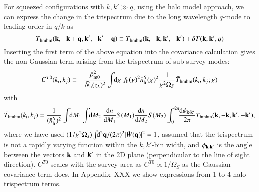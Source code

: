 \documentclass[onecolumn,notitlepage,showpacs,amsmath,amssymb,prd,floatfix]{revtex4-1}
\newcommand{\bk}{{\bf k}}
\newcommand{\bq}{{\bf q}}
\newcommand{\tW}{\tilde{W}}
\newcommand{\dr}{\mathrm{d}}
\newcommand{\bnhs}{\bar{n}_{\rm h}^S}
\newcommand{\bNh}{\bar{N}_{\rm h}}
\begin{document}
For squeezed configurations with $k,k'\gg q$, using the halo model
approach, we can express the change in the trispectrum due to the long
wavelength $q$-mode to leading order in $q/k$ as
%
\begin{equation}
 T_{\rm hmhm}(\bk,-\bk+\bq,\bk',-\bk'-\bq)\equiv T_{\rm
  hmhm}(\bk,-\bk,\bk',-\bk')
  +\delta T(\bk,\bk',q)
  \label{eq:def_dT}
\end{equation}
%
Inserting the first term of the above equation into the covariance
calculation gives the non-Gaussian term arising from the trispectrum of
sub-survey modes:
%
\begin{eqnarray}
 C^{T0}(k_i,k_j)&\equiv &\frac{\bar{\rho}_{\rm m0}^2}{\bNh(z_L)^2}
  \int\!\!\dr\chi~f_{\rm h}(\chi)^2 \bnhs(\chi)^2\frac{1}{\chi^2\Omega_S}
    \bar{T}_{\rm
    hmhm}(k_i,k_j;\chi)
    \label{eq:cov_T0}
\end{eqnarray}
%
with
%
\begin{equation}
\bar{T}_{\rm hmhm}(k_i,k_j)=\frac{1}{(\bnhs)^2}\int\!\!\dr
 M_1\int\!\!\dr M_2~\frac{\dr n}{\dr M_1}S(M_1)\frac{\dr n}{\dr
 M_2}S(M_2)
 \int^{2\pi}_0\!\!\frac{\dr\phi_{\bk\cdot\bk'}}{2\pi}T_{\rm hmhm}(\bk,-\bk,\bk',-\bk'),
\end{equation}
%
where we have used
$(1/\chi^2\Omega_s)\int\!\!\dr^2\bq/(2\pi)^2|\tW(\bq)|^2=1$, assumed
that the trispectrum is not a rapidly varying function within the
$k,k'$-bin width, and $\phi_{\bk\cdot\bk'}$ is the angle between the
vectors $\bk$ and $\bk'$ in the 2D plane (perpendicular to the line of
sight direction). $C^{T0}$ scales with the survey area as $C^{T0}\propto
1/\Omega_S$ as the Gaussian covariance term does.  In Appendix~XXX we
show expressions from 1 to 4-halo trispectrum terms. 
\end{document}
